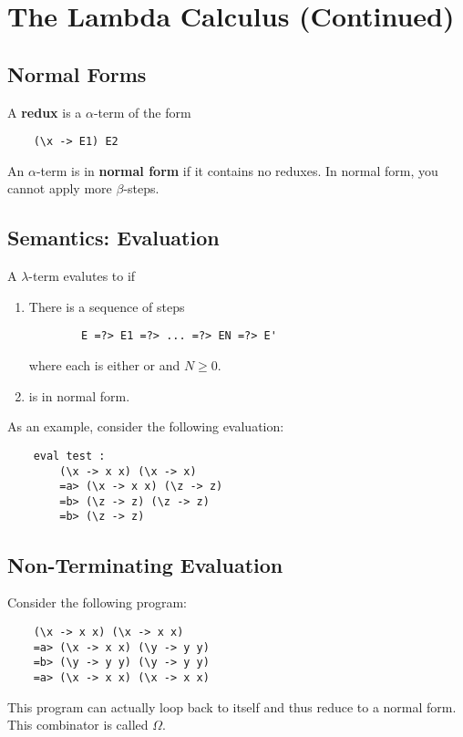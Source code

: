 \documentclass[letterpaper]{article}
\begin{document}
\section{The Lambda Calculus (Continued)}

\subsection{Normal Forms}
A \textbf{redux} is a $\alpha$-term of the form 
\begin{verbatim}
    (\x -> E1) E2
\end{verbatim}
An $\alpha$-term is in \textbf{normal form} if it contains no reduxes. In normal form, you cannot apply more $\beta$-steps.

\subsection{Semantics: Evaluation}
A $\lambda$-term  evalutes to  if 
\begin{enumerate}
    \item There is a sequence of steps 
    \begin{verbatim}
        E =?> E1 =?> ... =?> EN =?> E'
    \end{verbatim}
    where each  is either  or  and $N \geq 0$.

    \item {} is in normal form. 
\end{enumerate}

As an example, consider the following evaluation: 
\begin{verbatim}
    eval test :
        (\x -> x x) (\x -> x)
        =a> (\x -> x x) (\z -> z)
        =b> (\z -> z) (\z -> z)
        =b> (\z -> z)
\end{verbatim}

\subsection{Non-Terminating Evaluation}
Consider the following program: 
\begin{verbatim}
    (\x -> x x) (\x -> x x)
    =a> (\x -> x x) (\y -> y y)
    =b> (\y -> y y) (\y -> y y)
    =a> (\x -> x x) (\x -> x x)
\end{verbatim}
This program can actually loop back to itself and thus reduce to a normal form. This combinator is called $\Omega$. 
\end{document}

